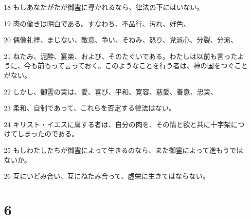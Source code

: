 \par 18 もしあなたがたが御霊に導かれるなら、律法の下にはいない。
\par 19 肉の働きは明白である。すなわち、不品行、汚れ、好色、
\par 20 偶像礼拝、まじない、敵意、争い、そねみ、怒り、党派心、分裂、分派、
\par 21 ねたみ、泥酔、宴楽、および、そのたぐいである。わたしは以前も言ったように、今も前もって言っておく。このようなことを行う者は、神の国をつぐことがない。
\par 22 しかし、御霊の実は、愛、喜び、平和、寛容、慈愛、善意、忠実、
\par 23 柔和、自制であって、これらを否定する律法はない。
\par 24 キリスト・イエスに属する者は、自分の肉を、その情と欲と共に十字架につけてしまったのである。
\par 25 もしわたしたちが御霊によって生きるのなら、また御霊によって進もうではないか。
\par 26 互にいどみ合い、互にねたみ合って、虚栄に生きてはならない。

\chapter{6}

